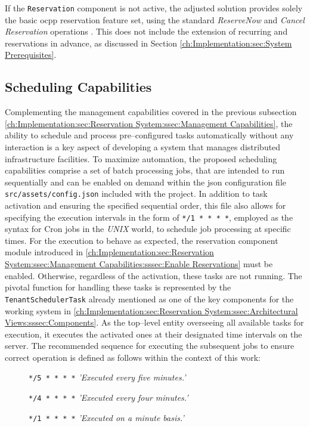 \noindent If the \texttt{Reservation} component is not active, the adjusted solution provides solely the basic \acrshort{ocpp} reservation feature set, using the standard \textit{ReserveNow} and \textit{Cancel Reservation} operations \cite{noauthor_ocpp_nodate}. 
This does not include the extension of recurring and reservations in advance, as discussed in Section \ref{ch:Implementation:sec:System Prerequisites}.

\subsection{Scheduling Capabilities}
\label{ch:Implementation:sec:Reservation System:ssec:Scheduling Capabilities}

Complementing the management capabilities covered in the previous subsection \ref{ch:Implementation:sec:Reservation System:ssec:Management Capabilities}, the ability to schedule and process pre--configured tasks automatically without any interaction is a key aspect of developing a system that manages distributed infrastructure facilities. 
To maximize automation, the proposed scheduling capabilities comprise a set of batch processing jobs, that are intended to run sequentially and can be enabled on demand within the \acrshort{json} configuration file \texttt{src/assets/config.json} included with the project. 
In addition to task activation and ensuring the specified sequential order, this file also allows for specifying the execution intervals in the form of \texttt{*/1 * * * *}, employed as the syntax for Cron jobs in the \textit{UNIX} world, to schedule job processing at specific times.
For the execution to behave as expected, the reservation component module introduced in \ref{ch:Implementation:sec:Reservation System:ssec:Management Capabilities:sssec:Enable Reservations} must be enabled. Otherwise, regardless of the activation, these tasks are not running.
The pivotal function for handling these tasks is represented by the \texttt{TenantSchedulerTask} already mentioned as one of the key components for the working system in \ref{ch:Implementation:sec:Reservation System:ssec:Architectural Views:sssec:Components}.
As the top--level entity overseeing all available tasks for execution, it executes the activated ones at their designated time intervals on the server.
The recommended sequence for executing the subsequent jobs to ensure correct operation is defined as follows within the context of this work:
\begin{description}
    \item[]{ \texttt{*/5 * * * *} \quad \textit{'Executed every five minutes.'}}
    \item[]{ \texttt{*/4 * * * *} \quad \textit{'Executed every four minutes.'}}
    \item[]{ \texttt{*/1 * * * *} \quad \textit{'Executed on a minute basis.'}}
\end{description}

